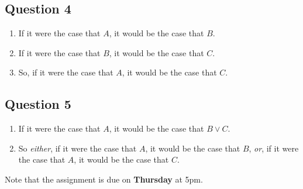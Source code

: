 \documentclass[
  11pt,
]{article}
\providecommand{\tightlist}{%
  \setlength{\itemsep}{0pt}\setlength{\parskip}{0pt}}
\begin{document}
\hypertarget{question-4}{%
\subsection{Question 4}\label{question-4}}

\begin{enumerate}
\def\labelenumi{\arabic{enumi}.}
\tightlist
\item
  If it were the case that \(A\), it would be the case that \(B\).
\item
  If it were the case that \(B\), it would be the case that \(C\).
\item
  So, if it were the case that \(A\), it would be the case that \(C\).
\end{enumerate}

\hypertarget{question-5}{%
\subsection{Question 5}\label{question-5}}

\begin{enumerate}
\def\labelenumi{\arabic{enumi}.}
\tightlist
\item
  If it were the case that \(A\), it would be the case that
  \(B \vee C\).
\item
  So \textit{either}, if it were the case that \(A\), it would be the
  case that \(B\), \textit{or}, if it were the case that \(A\), it would
  be the case that \(C\).
\end{enumerate}

Note that the assignment is due on \textbf{Thursday} at 5pm.
\end{document}
